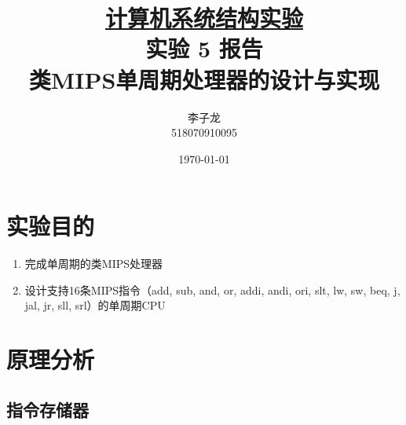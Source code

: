 \documentclass[a4paper,UTF8]{ctexart}
\begin{document}
\title{\normalsize \underline{计算机系统结构实验}\\\LARGE 实验 5 报告\\\vspace*{1em}\normalsize 类MIPS单周期处理器的设计与实现}
\author{李子龙\\ 518070910095}
\date{\today}
\maketitle
\tableofcontents
\clearpage

\section{实验目的}

\begin{enumerate}
    \item 完成单周期的类MIPS处理器
    \item 设计支持16条MIPS指令（add, sub, and, or, addi, andi, ori, slt, lw, sw, beq, j, jal, jr, sll, srl）的单周期CPU
\end{enumerate}

\section{原理分析}

\subsection{指令存储器}
\end{document}
